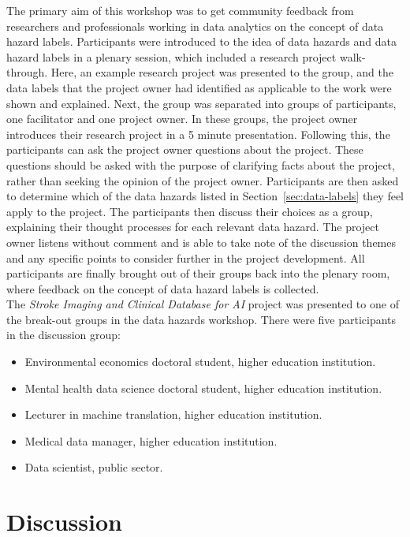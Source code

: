 \documentclass{article}
\begin{document}
The primary aim of this workshop was to get community feedback from
researchers and professionals working in data analytics on the concept
of data hazard labels.
Participants were introduced to the idea of data hazards and data
hazard labels in a plenary session, which included a research project
walk-through. Here, an example research project was presented to the
group, and the data labels that the project owner had identified as
applicable to the work were shown and explained.
Next, the group was separated into groups of participants, one
facilitator and one project owner.
In these groups, the project owner introduces their research project
in a 5 minute presentation. Following this, the participants can ask
the project owner questions about the project. These questions should
be asked with the purpose of clarifying facts about the project,
rather than seeking the opinion of the project owner.
Participants are then asked to determine which of the data hazards
listed in Section~\ref{sec:data-labels} they feel apply to the
project. The participants then discuss their choices as a group,
explaining their thought processes for each relevant data hazard.
The project owner listens without comment and is able to take note of
the discussion themes and any specific points to consider further in
the project development. All participants are finally brought out of
their groups back into the plenary room, where feedback on the concept
of data hazard labels is collected. \\

The \textit{Stroke Imaging and Clinical Database for AI} project was
presented to one of the break-out groups in the data hazards workshop.
There were five participants in the discussion group:

\begin{itemize}
\item Environmental economics doctoral student, higher education institution. 
\item Mental health data science doctoral student, higher education institution.
\item Lecturer in machine translation, higher education institution.
\item Medical data manager, higher education institution.
\item Data scientist, public sector.
\end{itemize}


\section{Discussion}
\end{document}
